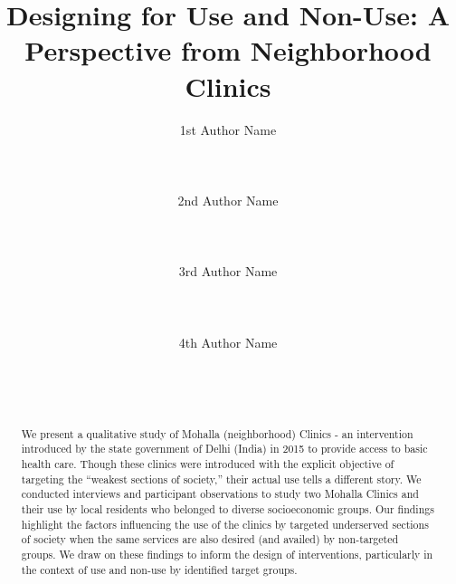 \documentclass{sigchi}
\begin{document}
\title{Designing for Use and Non-Use: A Perspective from Neighborhood Clinics}
\author{
  \alignauthor 1st Author Name\\
    \\
    \\
    \\
  \alignauthor 2nd Author Name\\
    \\
    \\
    \\
  \alignauthor 3rd Author Name\\
    \\
    \\
    \\
  \alignauthor 4th Author Name\\
    \\
    \\
    \\
}

\maketitle
\begin{abstract}
We present a qualitative study of Mohalla (neighborhood) Clinics - an intervention introduced by the state government of Delhi (India) in 2015 to provide access to basic health care. Though these clinics were introduced with the explicit objective of targeting the ``weakest sections of society,'' their actual use tells a different story. We conducted interviews and participant observations to study two Mohalla Clinics and their use by local residents who belonged to diverse socioeconomic groups. Our findings highlight the factors influencing the use of the clinics by targeted underserved sections of society when the same services are also desired (and availed) by non-targeted groups. We draw on these findings to inform the design of interventions, particularly in the context of use and non-use by identified target groups.

\end{abstract}

\end{document}
